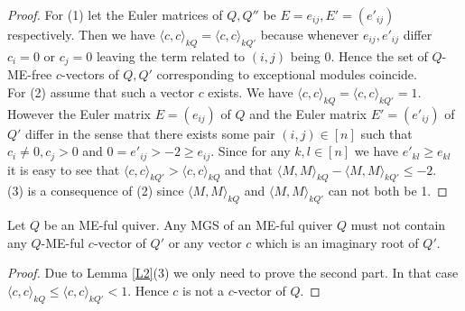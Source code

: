 \begin{proof}
\indent For (1) let the Euler matrices of $Q, Q''$ be $E = e_{ij}, E' = (e'_{ij})$ respectively. Then we have $\langle c,c\rangle_{kQ} = \langle c,c\rangle_{kQ'}$ because whenever $e_{ij}, e'_{ij}$ differ $c_i = 0$ or $c_j = 0$ leaving the term related to $(i,j)$ being 0. Hence the set of $Q$-ME-free $c$-vectors of $Q, Q'$ corresponding to exceptional modules coincide.\\
\indent For (2) assume that such a vector $c$ exists. We have $\langle c,c\rangle_{kQ} = \langle c,c\rangle_{kQ'} = 1$. However the Euler matrix $E = (e_{ij})$ of $Q$ and the Euler matrix $E' = (e'_{ij})$ of $Q'$ differ in the sense that there exists some pair $(i,j)\in [n]$ such that $c_i\neq 0, c_j> 0$ and $0 = e'_{ij} > -2 \geq e_{ij}$. Since for any $k,l\in [n]$ we have $e'_{kl}\geq e_{kl}$ it is easy to see that $\langle c,c\rangle_{kQ'} > \langle c,c\rangle_{kQ}$ and that $\langle M,M\rangle_{kQ} - \langle M,M\rangle_{kQ'} \leq -2$.\\
\indent (3) is a consequence of (2) since $\langle M,M\rangle_{kQ}$ and $\langle M,M\rangle_{kQ'} $ can not both be 1.
\end{proof}
\begin{lemma}
Let $Q$ be an ME-ful quiver. Any MGS of an ME-ful quiver $Q$ must not contain any $Q$-ME-ful $c$-vector of $Q'$ or any vector $c$ which is an imaginary root of $Q'$.
\end{lemma}
\begin{proof}
\indent Due to Lemma \ref{L2}(3) we only need to prove the second part. In that case $\langle c,c\rangle_{kQ} \leq \langle c,c\rangle_{kQ'} < 1$. Hence $c$ is not a $c$-vector of $Q$.
\end{proof}
